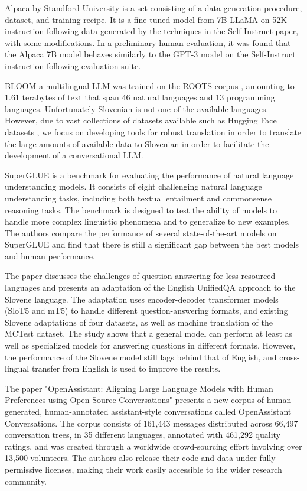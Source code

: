 \documentclass[fleqn,moreauthors,10pt]{ds_report}
\begin{document}
Alpaca \cite{alpaca} by Standford University is a set consisting of a data generation procedure, dataset, and training recipe. It is a fine tuned model from 7B LLaMA \cite{touvron2023llama} on 52K instruction-following data generated by the techniques in the Self-Instruct \cite{wang2022selfinstruct} paper, with some modifications. In a preliminary human evaluation, it was found that the Alpaca 7B model behaves similarly to the GPT-3 model on the Self-Instruct instruction-following evaluation suite.

BLOOM \cite{scao2022bloom} a multilingual LLM  was trained on the ROOTS corpus \cite{roots}, amounting to 1.61 terabytes of text that span 46 natural languages and 13 programming languages. Unfortunately Slovenian is not one of the available languages. However, due to vast collections of datasets available such as  Hugging Face datasets \cite{lhoest2021datasets}, we focus on developing tools for robust translation in order to translate the large amounts of available data to Slovenian in order to facilitate the development of a conversational LLM.


SuperGLUE \cite{wang2019superglue} is a benchmark for evaluating the performance of natural language understanding models. It consists of eight challenging natural language understanding tasks, including both textual entailment and commonsense reasoning tasks. The benchmark is designed to test the ability of models to handle more complex linguistic phenomena and to generalize to new examples. The authors compare the performance of several state-of-the-art models on SuperGLUE and find that there is still a significant gap between the best models and human performance.

The paper \cite{logar2022unified} discusses the challenges of question answering for less-resourced languages and presents an adaptation of the English UnifiedQA approach to the Slovene language. The adaptation uses encoder-decoder transformer models (SloT5 and mT5) to handle different question-answering formats, and existing Slovene adaptations of four datasets, as well as machine translation of the MCTest dataset. The study shows that a general model can perform at least as well as specialized models for answering questions in different formats. However, the performance of the Slovene model still lags behind that of English, and cross-lingual transfer from English is used to improve the results.

The paper "OpenAssistant: Aligning Large Language Models with Human Preferences using Open-Source Conversations" \cite{köpf2023openassistant} presents a new corpus of human-generated, human-annotated assistant-style conversations called OpenAssistant Conversations. The corpus consists of 161,443 messages distributed across 66,497 conversation trees, in 35 different languages, annotated with 461,292 quality ratings, and was created through a worldwide crowd-sourcing effort involving over 13,500 volunteers. The authors also release their code and data under fully permissive licenses, making their work easily accessible to the wider research community. 
\end{document}
